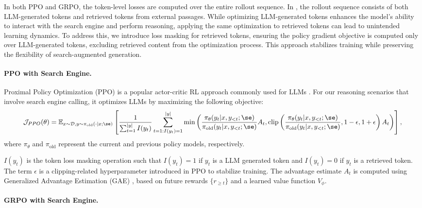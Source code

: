 In both PPO and GRPO, the token-level losses are computed over the entire rollout sequence. In \Ours, the rollout sequence consists of both LLM-generated tokens and retrieved tokens from external passages.
While optimizing LLM-generated tokens enhances the model’s ability to interact with the search engine and perform reasoning, applying the same optimization to retrieved tokens can lead to unintended learning dynamics. To address this, we introduce loss masking for retrieved tokens, ensuring the policy gradient objective is computed only over LLM-generated tokens, excluding retrieved content from the optimization process. This approach stabilizes training while preserving the flexibility of search-augmented generation.

\paragraph{PPO with Search Engine.}

Proximal Policy Optimization (PPO) \citep{schulman2017proximal} is a popular actor-critic RL approach commonly used for LLMs \citep{ouyang2022training}.
For our reasoning scenarios that involve search engine calling, it optimizes LLMs by maximizing the following objective:
{\scriptsize
\begin{gather}\label{eq:ppo}
\mathcal{J}_{PPO}(\theta) = \mathbb{E}_{x \sim \mathcal{D}, y \sim \pi_{\text{old}}( \cdot| x; \se)}
\left[ \frac{1}{\sum_{t=1}^{|y|} I(y_t)} \sum_{t=1: I(y_t)=1}^{|y|}
\min \left( \frac{\pi_{\theta}(y_t | x, y_{<t}; \se)}{\pi_{\text{old}}(y_t | x, y_{<t}; \se)} A_t, 
\text{clip} \left( \frac{\pi_{\theta}(y_t | x, y_{<t}; \se)}{\pi_{\text{old}}(y_t | x, y_{<t}; \se)}, 1 - \epsilon, 1 + \epsilon \right) A_t 
\right) \right],
\end{gather}}
where \( \pi_{\theta} \) and \( \pi_{\text{old}} \) represent the current and previous policy models, respectively. 

$I(y_t)$ is the token loss masking operation such that $I(y_t)=1$ if $y_t$ is a LLM generated token and $I(y_t)=0$ if $y_t$ is a retrieved token.
The term \( \epsilon \) is a clipping-related hyperparameter introduced in PPO to stabilize training. 
The advantage estimate \( A_t \) is computed using Generalized Advantage Estimation (GAE) \citep{schulman2015high}, based on future rewards \( \{ r_{\geq t} \} \) and a learned value function \( V_{\phi} \).

\paragraph{GRPO with Search Engine.}

